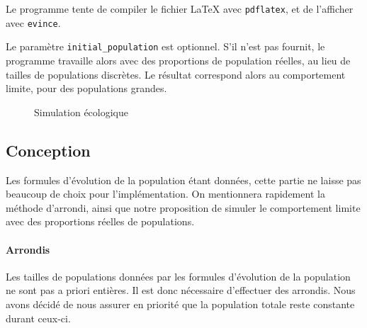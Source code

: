 \documentclass[10pt]{article}
\begin{document}
Le programme tente de compiler le fichier \LaTeX{} avec \verb|pdflatex|, et de l'afficher avec \verb|evince|.

Le paramètre \verb|initial_population| est optionnel. S'il n'est pas fournit, le programme travaille
alors avec des proportions de population réelles, au lieu de tailles de populations discrètes.
Le résultat correspond alors au comportement limite, pour des populations grandes.

\begin{figure}
\caption{Simulation écologique}
\label{sim_plot}
\begin{center}
\end{center}
\end{figure}

\subsection{Conception}
Les formules d'évolution de la population étant données, cette partie ne laisse pas beaucoup de choix pour l'implémentation.
On mentionnera rapidement la méthode d'arrondi, ainsi que notre proposition de simuler le comportement limite avec
des proportions réelles de populations.

\paragraph{Arrondis}
Les tailles de populations données par les formules d'évolution de la population ne sont pas a priori entières.
Il est donc nécessaire d'effectuer des arrondis.
Nous avons décidé de nous assurer en priorité que la population totale reste constante durant ceux-ci.
\end{document}
